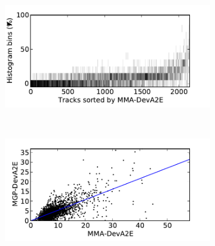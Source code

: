 \documentclass{article}
\begin{document}
\begin{figure}
      \begin{subfigure}[b]{0.25\textwidth}
              \includegraphics[width=\textwidth]{plots/histo-DevA2E.pdf}
              \caption{}
              \label{fig:histo-DevA2E}
      \end{subfigure}%
      ~ 
      \begin{subfigure}[b]{0.25\textwidth}
              \includegraphics[width=\textwidth]{plots/correl-DevA2E.pdf}
              \caption{}
              \label{fig:correl-DevA2E}
      \end{subfigure}


\end{figure}
\end{document}
